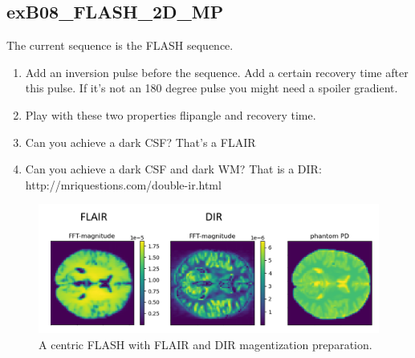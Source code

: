 \documentclass[a4paper,12pt]{extarticle}
\begin{document}
\subsection{exB08\_FLASH\_2D\_MP}
The current sequence is the FLASH sequence.
\begin{enumerate}
\item  Add an inversion pulse before the sequence. Add a certain recovery time after this pulse. If it's not an 180 degree pulse you might need a spoiler gradient.
\item  Play with these two properties flipangle and recovery time.
\item  Can you achieve a dark CSF? That's a FLAIR
\item  Can you achieve a dark CSF and dark WM? That is a DIR: http://mriquestions.com/double-ir.html
\end{enumerate}

\begin{figure}[H] 
\centering
\includegraphics[width=15cm]{img/exB08_FLASH_MP.png}
\caption{A centric FLASH with FLAIR and DIR magentization preparation.} \label{fig:exB08_FLASh_MP}
\end{figure}
\end{document}
